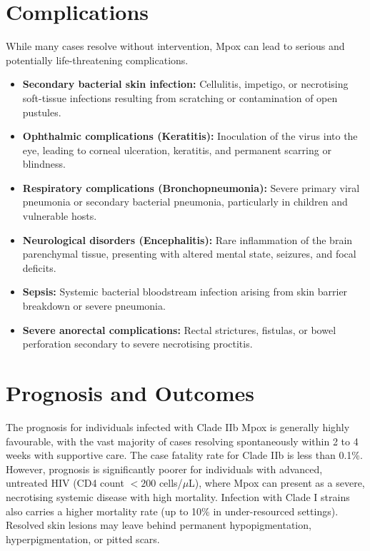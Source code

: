 \section*{Complications}
While many cases resolve without intervention, Mpox can lead to serious and potentially life-threatening complications.
\begin{itemize}
    \item \textbf{Secondary bacterial skin infection:} Cellulitis, impetigo, or necrotising soft-tissue infections resulting from scratching or contamination of open pustules.
    \item \textbf{Ophthalmic complications (Keratitis):} Inoculation of the virus into the eye, leading to corneal ulceration, keratitis, and permanent scarring or blindness.
    \item \textbf{Respiratory complications (Bronchopneumonia):} Severe primary viral pneumonia or secondary bacterial pneumonia, particularly in children and vulnerable hosts.
    \item \textbf{Neurological disorders (Encephalitis):} Rare inflammation of the brain parenchymal tissue, presenting with altered mental state, seizures, and focal deficits.
    \item \textbf{Sepsis:} Systemic bacterial bloodstream infection arising from skin barrier breakdown or severe pneumonia.
    \item \textbf{Severe anorectal complications:} Rectal strictures, fistulas, or bowel perforation secondary to severe necrotising proctitis.
\end{itemize}

\section*{Prognosis and Outcomes}
The prognosis for individuals infected with Clade IIb Mpox is generally highly favourable, with the vast majority of cases resolving spontaneously within 2 to 4 weeks with supportive care. The case fatality rate for Clade IIb is less than 0.1\%. However, prognosis is significantly poorer for individuals with advanced, untreated HIV (CD4 count $<200$ cells/$\mu$L), where Mpox can present as a severe, necrotising systemic disease with high mortality. Infection with Clade I strains also carries a higher mortality rate (up to 10\% in under-resourced settings). Resolved skin lesions may leave behind permanent hypopigmentation, hyperpigmentation, or pitted scars.

